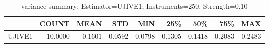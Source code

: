 \begin{table}[ht]
\centering
\caption{variance summary: Estimator=UJIVE1, Instruments=250, Strength=0.10}
\begin{tabular}{lrrrrrrrr}
\toprule
 & COUNT & MEAN & STD & MIN & 25\% & 50\% & 75\% & MAX \\
\midrule
UJIVE1 & 10.0000 & 0.1601 & 0.0592 & 0.0798 & 0.1305 & 0.1418 & 0.2083 & 0.2483 \\
\bottomrule
\end{tabular}
\end{table}
